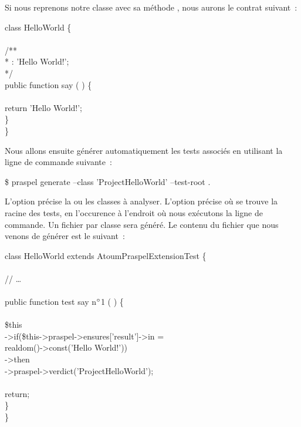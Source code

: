 \begin{example}

Si nous reprenons notre classe  avec sa méthode
, nous aurons le contrat suivant~:
%
\begin{pre}
class HelloWorld \{ \\
 \\
    /** \\
     * \aensures \aresult: 'Hello World!'; \\
     */ \\
    public function say ( ) \{ \\
 \\
        return 'Hello World!'; \\
    \} \\
\}
\end{pre}
%
Nous allons ensuite générer automatiquement les tests associés en utilisant la
ligne de commande suivante~:
%
\begin{pre}
\$ praspel generate --class 'Project\bslash{}HelloWorld' --test-root .
\end{pre}
%
L'option  précise la ou les classes à analyser. L'option
 précise où se trouve la racine des tests, en
l'occurence à l'endroit où nous exécutons la ligne de commande. Un fichier par
classe sera généré. Le contenu du fichier que nous venons de générer est le
suivant~:

\begin{bigpre}
class HelloWorld extends \bslash{}Atoum\bslash{}PraspelExtension\bslash{}Test \{ \\
 \\
    // … \\
 \\
    public function test say n\(\sp{\circ}\)1 ( ) \{ \\
 \\
        \$this \\
            ->if(\$this->praspel->ensures['\bslash{}result']->in = \\
                realdom()->const('Hello World!')) \\
            ->then \\
                ->praspel->verdict('\bslash{}Project\bslash{}HelloWorld');  \\
 \\
        return; \\
    \} \\
\}
\end{bigpre}


\end{example}
